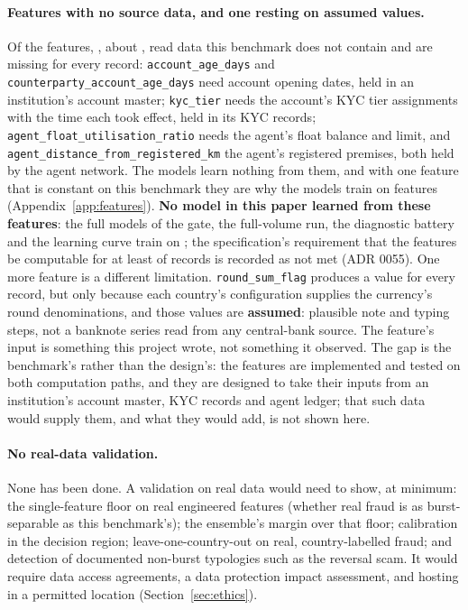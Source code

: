 \paragraph{Features with no source data, and one resting on assumed values.} Of the \nFeatures{}
features, \nNoSourceFeatures{}, about \nNoSourceShare{}, read data this benchmark does not contain and
are missing for every record: \texttt{account\_age\_days} and
\texttt{counterparty\_account\_age\_days} need account opening dates, held in an institution's account
master; \texttt{kyc\_tier} needs the account's KYC tier assignments with the time each took effect,
held in its KYC records; \texttt{agent\_float\_utilisation\_ratio} needs the agent's float balance and
limit, and \texttt{agent\_distance\_from\_registered\_km} the agent's registered premises, both held by
the agent network. The models learn nothing from them, and with one feature that is constant on this
benchmark they are why the models train on \nTrainableFeatures{} features (Appendix~\ref{app:features}).
\textbf{No model in this paper learned from these features}: the full models of the gate, the full-volume run,
the diagnostic battery and the learning curve train on \nTrainableFeatures{}; the specification's requirement that the features be computable for at least
\nComputableTarget{} of records is recorded as not met (ADR 0055). One more feature is a different limitation. \texttt{round\_sum\_flag} produces a
value for every record, but only because each country's configuration supplies the currency's round
denominations, and those values are \textbf{assumed}: plausible note and typing steps, not a banknote
series read from any central-bank source. The feature's input is something this project wrote, not
something it observed. The gap is the benchmark's rather than the design's: the \nNoSourceFeatures{} features are
implemented and tested on both computation paths, and they are designed to take their inputs from an institution's
account master, KYC records and agent ledger; that such data would supply them, and what they would
add, is not shown here.

\paragraph{No real-data validation.} None has been done. A validation on real data would need to
show, at minimum: the single-feature floor on real engineered features (whether real fraud is as
burst-separable as this benchmark's); the ensemble's margin over that floor; calibration in the
decision region; leave-one-country-out on real, country-labelled fraud; and detection of
documented non-burst typologies such as the reversal scam. It would require data access agreements,
a data protection impact assessment, and hosting in a permitted location (Section~\ref{sec:ethics}).

